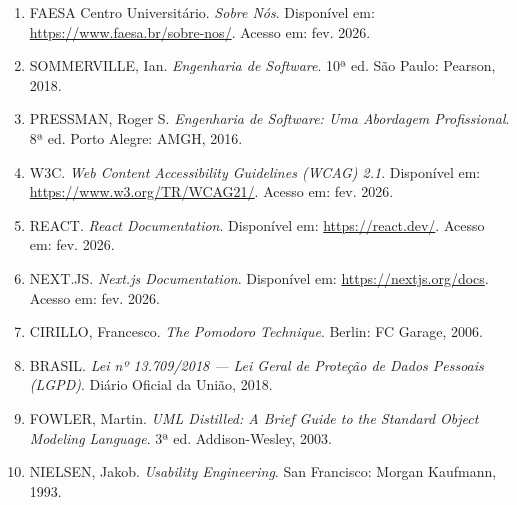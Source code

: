 \documentclass[12pt, a4paper]{article}
\begin{document}
\begin{enumerate}[leftmargin=2cm]
    \item FAESA Centro Universitário. \textit{Sobre Nós}. Disponível em: \url{https://www.faesa.br/sobre-nos/}. Acesso em: fev. 2026.
    
    \item SOMMERVILLE, Ian. \textit{Engenharia de Software}. 10ª ed. São Paulo: Pearson, 2018.
    
    \item PRESSMAN, Roger S. \textit{Engenharia de Software: Uma Abordagem Profissional}. 8ª ed. Porto Alegre: AMGH, 2016.
    
    \item W3C. \textit{Web Content Accessibility Guidelines (WCAG) 2.1}. Disponível em: \url{https://www.w3.org/TR/WCAG21/}. Acesso em: fev. 2026.
    
    \item REACT. \textit{React Documentation}. Disponível em: \url{https://react.dev/}. Acesso em: fev. 2026.
    
    \item NEXT.JS. \textit{Next.js Documentation}. Disponível em: \url{https://nextjs.org/docs}. Acesso em: fev. 2026.
    
    \item CIRILLO, Francesco. \textit{The Pomodoro Technique}. Berlin: FC Garage, 2006.
    
    \item BRASIL. \textit{Lei nº 13.709/2018 --- Lei Geral de Proteção de Dados Pessoais (LGPD)}. Diário Oficial da União, 2018.
    
    \item FOWLER, Martin. \textit{UML Distilled: A Brief Guide to the Standard Object Modeling Language}. 3ª ed. Addison-Wesley, 2003.
    
    \item NIELSEN, Jakob. \textit{Usability Engineering}. San Francisco: Morgan Kaufmann, 1993.
\end{enumerate}

\end{document}

